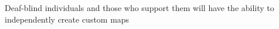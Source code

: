 Deaf-blind individuals and those who support them will have the ability to independently create custom maps
